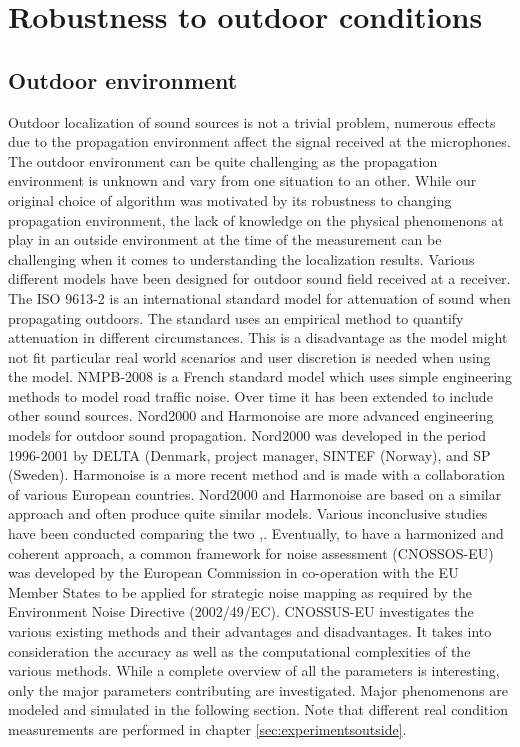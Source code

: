 \section{Robustness to outdoor conditions}
\subsection{Outdoor environment}
Outdoor localization of sound sources is not a trivial problem, numerous effects due to the propagation environment affect the signal received at the microphones. The outdoor environment can be quite challenging as the propagation environment is unknown and vary from one situation to an other. While our original choice of algorithm was motivated by its robustness to changing propagation environment, the lack of knowledge on the physical phenomenons at play in an outside environment at the time of the measurement can be challenging when it comes to understanding the localization results. Various different models have been designed for outdoor sound field received at a receiver. The ISO 9613-2 \cite{ISO9613} is an international standard model for attenuation of sound when propagating outdoors. The standard uses an empirical method to quantify attenuation in different circumstances. This is a disadvantage as the model might not fit particular real world scenarios and user discretion is needed when using the model. NMPB-2008 \cite{dutilleux2010nmpb} is a French standard model which uses simple engineering methods to model road traffic noise. Over time it has been extended to include other sound sources. Nord2000 \cite{plovsing2000nord2000} and Harmonoise \cite{defrance2007outdoor} are more advanced engineering models for outdoor sound propagation. Nord2000 was developed in the period 1996-2001 by DELTA (Denmark, project manager, SINTEF (Norway), and SP (Sweden). Harmonoise is a more recent method and is made with a collaboration of various European countries. Nord2000 and Harmonoise are based on a similar approach and often produce quite similar models. Various inconclusive studies have been conducted comparing the two \cite{garg2014critical},\cite{jonsson2008comparison}. Eventually, to have a harmonized and coherent approach, a common framework for noise assessment (CNOSSOS-EU) was developed by the European Commission \cite{kephalopoulos2012common} in co-operation with the EU Member States to be applied for strategic noise mapping as required by the Environment Noise Directive (2002/49/EC). CNOSSUS-EU investigates the various existing methods and their advantages and disadvantages. It takes into consideration the accuracy as well as the computational complexities of the various methods. While a complete overview of all the parameters is interesting, only the major parameters contributing are investigated. Major phenomenons are modeled and simulated in the following section. Note that different real condition measurements are performed in chapter \ref{sec:experimentsoutside}.

